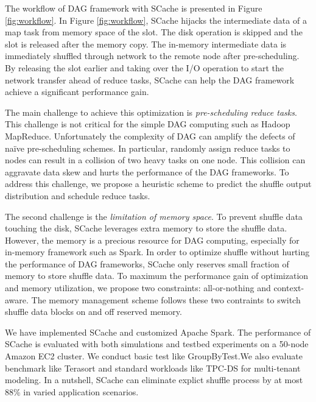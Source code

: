The workflow of DAG framework with SCache is presented in Figure \ref{fig:workflow}. In Figure \ref{fig:workflow}, SCache hijacks the intermediate data of a map task from memory space of the slot. The disk operation is skipped and the slot is released after the memory copy. The in-memory intermediate data is immediately shuffled through network to the remote node after pre-scheduling. By releasing the slot earlier and taking over the I/O operation to start the network transfer ahead of reduce tasks, SCache can help the DAG framework achieve a significant performance gain.

The main challenge to achieve this optimization is \textit{pre-scheduling reduce tasks}. This challenge is not critical for the simple DAG computing such as Hadoop MapReduce\cite{mapreduce}. Unfortunately the complexity of DAG can amplify the defects of na\"{i}ve pre-scheduling schemes. In particular, randomly assign reduce tasks to nodes can result in a collision of two heavy tasks on one node. This collision can aggravate data skew and hurts the performance of the DAG frameworks. To address this challenge, we propose a heuristic scheme to predict the shuffle output distribution and schedule reduce tasks.

The second challenge is the \textit{limitation of memory space}. To prevent shuffle data touching the disk, SCache leverages extra memory to store the shuffle data. However, the memory is a precious resource for DAG computing, especially for in-memory framework such as Spark\cite{spark}. In order to optimize shuffle without hurting the performance of DAG frameworks, SCache only reserves small fraction of memory to store shuffle data. To maximum the performance gain of optimization and memory utilization, we propose two constraints: all-or-nothing and context-aware. The memory management scheme follows these two contraints to switch shuffle data blocks on and off reserved memory.

We have implemented SCache and customized Apache Spark\cite{apachespark}. The performance of SCache is evaluated with both simulations and testbed experiments on a 50-node Amazon EC2 cluster. We conduct basic test like GroupByTest.We also evaluate benchmark like Terasort\cite{spark-tera} and standard workloads like TPC-DS\cite{tpcds} for multi-tenant modeling. In a nutshell, SCache can eliminate explict shuffle process by at most 88\% in varied application scenarios.




